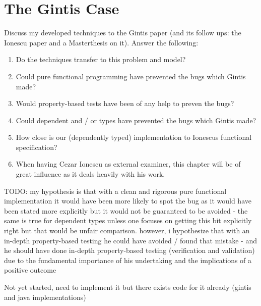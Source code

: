\section{The Gintis Case}
\label{sec:gintis_case}
Discuss my developed techniques to the Gintis paper (and its follow ups: the Ionescu paper \cite{botta_functional_2011} and a Masterthesis \cite{evensen_extensible_2010} on it). Answer the following:

\begin{enumerate}
	\item Do the techniques transfer to this problem and model? 
	
	\item Could pure functional programming have prevented the bugs which Gintis made? 
	
	\item Would property-based tests have been of any help to preven the bugs?
	
	\item Could dependent and / or types have prevented the bugs which Gintis made? 
	
	\item How close is our (dependently typed) implementation to Ionescus functional specification? 
	
	\item When having Cezar Ionescu as external examiner, this chapter will be of great influence as it deals heavily with his work.

\end{enumerate}

TODO: my hypothesis is that with a clean and rigorous pure functional implementation it would have been more likely to spot the bug as it would have been stated more explicitly but it would not be guaranteed to be avoided - the same is true for dependent types unless one focuses on getting this bit explicitly right but that would be unfair comparison. however, i hypothesize that with an in-depth property-based testing he could have avoided / found that mistake - and he should have done in-depth property-based testing (verification and validation) due to the fundamental importance of his undertaking and the implications of a positive outcome

Not yet started, need to implement it but there exists code for it already (gintis and java implementations)

%
%
%
%

